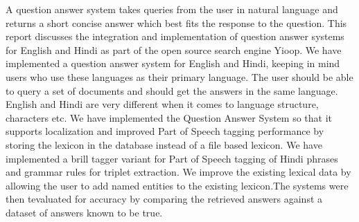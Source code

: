 A question answer system takes queries from the user in natural language and returns a short concise answer which best fits the response to the question. This report discusses the integration and implementation of question answer systems for English and Hindi as part of the  open source search engine Yioop. We have implemented a question answer system for English and Hindi, keeping in mind users who use these languages as their primary language. The user should be able to query a set of  documents and should get the answers in the same language. English and Hindi are very different when it comes to language structure, characters etc. We have implemented the Question Answer System so that it supports localization and improved Part of Speech tagging performance by storing the lexicon in the database instead of a file based lexicon. We have implemented a brill tagger variant for Part of Speech tagging of Hindi phrases and grammar rules for triplet extraction. We improve the existing lexical data by allowing the user to add named entities to the existing lexicon.The systems were then tevaluated for accuracy by comparing the retrieved answers against a dataset of answers known to be true.